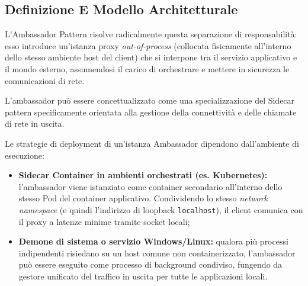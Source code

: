 \documentclass[11pt, a4paper]{article}
\begin{document}
\subsection{Definizione E Modello Architetturale}

L'Ambassador Pattern risolve radicalmente questa separazione di responsabilità: esso introduce un'istanza proxy \emph{out-of-process} (collocata fisicamente all'interno dello stesso ambiente host del client) che si interpone tra il servizio applicativo e il mondo esterno, assumendosi il carico di orchestrare e mettere in sicurezza le comunicazioni di rete.

L'ambassador può essere concettualizzato come una specializzazione del Sidecar pattern specificamente orientata alla gestione della connettività e delle chiamate di rete in uscita.


Le strategie di deployment di un'istanza Ambassador dipendono dall'ambiente di esecuzione:
\begin{itemize}[noitemsep]
    \item \textbf{Sidecar Container in ambienti orchestrati (es. Kubernetes):} l'ambassador viene istanziato come container secondario all'interno dello stesso Pod del container applicativo. Condividendo lo stesso \emph{network namespace} (e quindi l'indirizzo di loopback \texttt{localhost}), il client comunica con il proxy a latenze minime tramite socket locali;
    \item \textbf{Demone di sistema o servizio Windows/Linux:} qualora più processi indipendenti risiedano su un host comune non containerizzato, l'ambassador può essere eseguito come processo di background condiviso, fungendo da gestore unificato del traffico in uscita per tutte le applicazioni locali.
\end{itemize}
\end{document}
